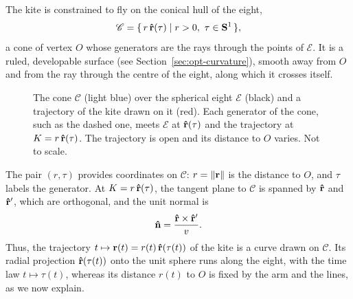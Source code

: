 The kite is constrained to fly on the conical hull of the eight,
\begin{equation}
    \mathscr{C} = \{\, r\,\vu r(\tau) \mid r>0,\ \tau\in\mathbf{S}^1 \,\},
\end{equation}
a cone of vertex \(O\) whose generators are the rays through the points of \(\mathscr{E}\).
It is a ruled, developable surface (see Section~\ref{sec:opt-curvature}), smooth away from \(O\) and from the ray through the centre of the eight, along which it crosses itself.
\begin{figure}
  \centering
  
  \caption{The cone \(\mathscr{C}\) (light blue) over the spherical eight \(\mathscr{E}\) (black) and a trajectory of the kite drawn on it (red). Each generator of the cone, such as the dashed one, meets \(\mathscr{E}\) at \(\vu r(\tau)\) and the trajectory at \(K = r\,\vu r(\tau)\). The trajectory is open and its distance to \(O\) varies. Not to scale.}
  \label{fig:cone_eight}
\end{figure}

The pair \((r,\tau)\) provides coordinates on \(\mathscr{C}\): \(r = \norm{\vb r}\) is the distance to \(O\), and \(\tau\) labels the generator.
At \(K = r\,\vu r(\tau)\), the tangent plane to \(\mathscr{C}\) is spanned by \(\vu r\) and \(\vu r'\), which are orthogonal, and the unit normal is
\begin{equation} \label{eq:cone-normal}
    \vu n = \frac{\vu r\times\vu r'}{v}.
\end{equation}
Thus, the trajectory \(t\mapsto\vb r(t) = r(t)\,\vu r(\tau(t))\) of the kite is a curve drawn on \(\mathscr{C}\).
Its radial projection \(\vu r(\tau(t))\) onto the unit sphere runs along the eight, with the time law \(t\mapsto\tau(t)\), whereas its distance \(r(t)\) to \(O\) is fixed by the arm and the lines, as we now explain.

